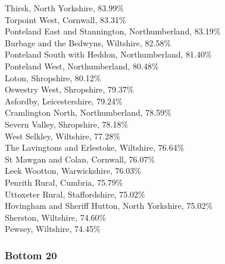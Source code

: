 \documentclass[a4paper,openany,10pt]{book}
\begin{document}
Thirsk, North Yorkshire, 83.99\%\\
Torpoint West, Cornwall, 83.31\%\\
Ponteland East and Stannington, Northumberland, 83.19\%\\
Burbage and the Bedwyns, Wiltshire, 82.58\%\\
Ponteland South with Heddon, Northumberland, 81.40\%\\
Ponteland West, Northumberland, 80.48\%\\
Loton, Shropshire, 80.12\%\\
Oswestry West, Shropshire, 79.37\%\\
Asfordby, Leicestershire, 79.24\%\\
Cramlington North, Northumberland, 78.59\%\\
Severn Valley, Shropshire, 78.18\%\\
West Selkley, Wiltshire, 77.28\%\\
The Lavingtons and Erlestoke, Wiltshire, 76.64\%\\
St Mawgan and Colan, Cornwall, 76.07\%\\
Leek Wootton, Warwickshire, 76.03\%\\
Penrith Rural, Cumbria, 75.79\%\\
Uttoxeter Rural, Staffordshire, 75.02\%\\
Hovingham and Sheriff Hutton, North Yorkshire, 75.02\%\\
Sherston, Wiltshire, 74.60\%\\
Pewsey, Wiltshire, 74.45\%\\

\subsubsection*{Bottom 20}
\end{document}
